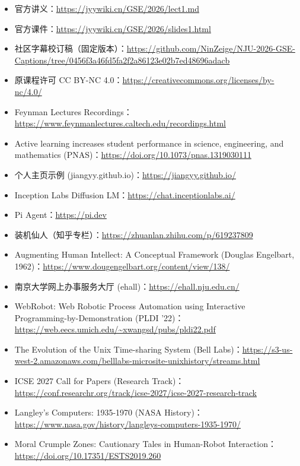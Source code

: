 \documentclass[UTF8,a4paper,11pt,fontset=fandol]{ctexart}
\begin{document}
\begin{itemize}

\item 官方讲义：\url{https://jyywiki.cn/GSE/2026/lect1.md}

\item 官方课件：\url{https://jyywiki.cn/GSE/2026/slides1.html}

\item 社区字幕校订稿（固定版本）：\url{https://github.com/NinZeige/NJU-2026-GSE-Captions/tree/0456f3a46fd5fa2f2a86123e02b7ed48696adacb}

\item 原课程许可 CC BY-NC 4.0：\url{https://creativecommons.org/licenses/by-nc/4.0/}

\item Feynman Lectures Recordings：\url{https://www.feynmanlectures.caltech.edu/recordings.html}

\item Active learning increases student performance in science, engineering, and mathematics (PNAS)：\url{https://doi.org/10.1073/pnas.1319030111}

\item 个人主页示例 (jiangyy.github.io)：\url{https://jiangyy.github.io/}

\item Inception Labs Diffusion LM：\url{https://chat.inceptionlabs.ai/}

\item Pi Agent：\url{https://pi.dev}

\item 装机仙人（知乎专栏）：\url{https://zhuanlan.zhihu.com/p/619237809}

\item Augmenting Human Intellect: A Conceptual Framework (Douglas Engelbart, 1962)：\url{https://www.dougengelbart.org/content/view/138/}

\item 南京大学网上办事服务大厅 (ehall)：\url{https://ehall.nju.edu.cn/}

\item WebRobot: Web Robotic Process Automation using Interactive Programming-by-Demonstration (PLDI '22)：\url{https://web.eecs.umich.edu/~xwangsd/pubs/pldi22.pdf}

\item The Evolution of the Unix Time-sharing System (Bell Labs)：\url{https://s3-us-west-2.amazonaws.com/belllabs-microsite-unixhistory/streams.html}

\item ICSE 2027 Call for Papers (Research Track)：\url{https://conf.researchr.org/track/icse-2027/icse-2027-research-track}

\item Langley's Computers: 1935-1970 (NASA History)：\url{https://www.nasa.gov/history/langleys-computers-1935-1970/}

\item Moral Crumple Zones: Cautionary Tales in Human-Robot Interaction：\url{https://doi.org/10.17351/ESTS2019.260}

\end{itemize}
\end{document}
